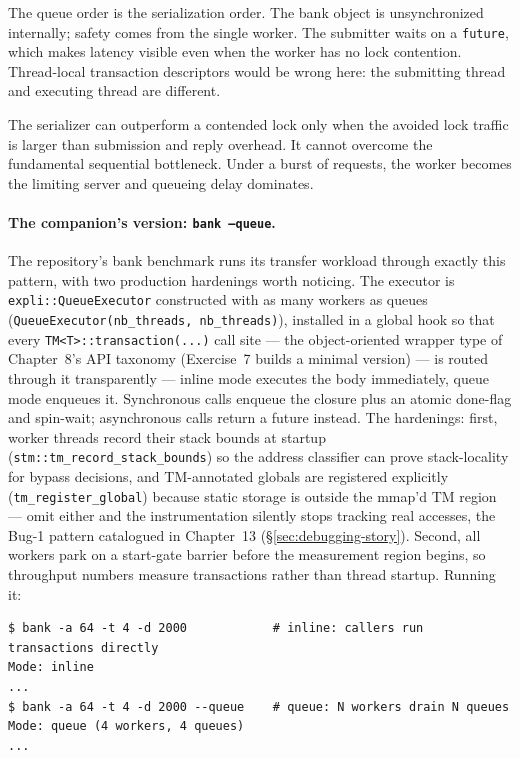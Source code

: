 The queue order is the serialization order. The bank object is unsynchronized internally; safety comes from the single worker. The submitter waits on a \texttt{future}, which makes latency visible even when the worker has no lock contention. Thread-local transaction descriptors would be wrong here: the submitting thread and executing thread are different.

The serializer can outperform a contended lock only when the avoided lock traffic is larger than submission and reply overhead. It cannot overcome the fundamental sequential bottleneck. Under a burst of requests, the worker becomes the limiting server and queueing delay dominates.

\paragraph{The companion's version: \texttt{bank --queue}.}
The repository's bank benchmark runs its transfer workload through exactly
this pattern, with two production hardenings worth noticing. The executor is
\texttt{expli::QueueExecutor} constructed with as many workers as queues
(\texttt{QueueExecutor(nb\_threads, nb\_threads)}), installed in a global hook
so that every \texttt{TM<T>::transaction(...)} call site --- the object-oriented
wrapper type of Chapter~8's API taxonomy (Exercise~7 builds a minimal version)
--- is routed through it
transparently --- inline mode executes the body immediately, queue mode
enqueues it. Synchronous calls enqueue the closure plus an atomic done-flag
and spin-wait; asynchronous calls return a future instead. The hardenings:
first, worker threads record their stack bounds at startup
(\texttt{stm::tm\_record\_stack\_bounds}) so the address classifier can prove
stack-locality for bypass decisions, and TM-annotated globals are registered
explicitly (\texttt{tm\_register\_global}) because static storage is outside
the mmap'd TM region --- omit either and the instrumentation silently stops
tracking real accesses, the Bug-1 pattern catalogued in Chapter~13
(\S\ref{sec:debugging-story}).
Second, all workers park on a start-gate barrier before the measurement
region begins, so throughput numbers measure transactions rather than thread
startup. Running it:

\begin{lstlisting}[caption={The companion bank under queue serialization versus inline execution.}]
$ bank -a 64 -t 4 -d 2000            # inline: callers run transactions directly
Mode: inline
...
$ bank -a 64 -t 4 -d 2000 --queue    # queue: N workers drain N queues
Mode: queue (4 workers, 4 queues)
...
\end{lstlisting}

